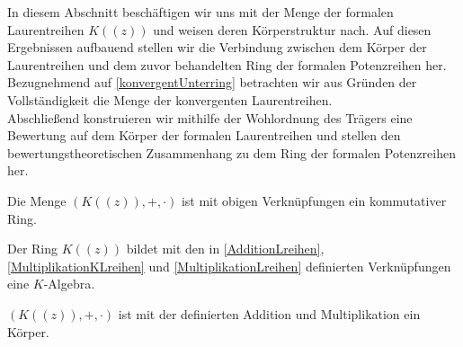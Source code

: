 In diesem Abschnitt beschäftigen wir uns mit der Menge der formalen Laurentreihen $K((z))$ und weisen deren Körperstruktur nach. Auf diesen Ergebnissen aufbauend stellen wir die Verbindung zwischen dem Körper der Laurentreihen und dem zuvor behandelten Ring der formalen Potenzreihen her. Bezugnehmend auf \ref{konvergentUnterring} betrachten wir aus Gründen der Vollständigkeit die Menge der konvergenten Laurentreihen. \\
Abschließend konstruieren wir mithilfe der Wohlordnung des Trägers eine Bewertung auf dem Körper der formalen Laurentreihen und stellen den bewertungstheoretischen Zusammenhang zu dem Ring der formalen Potenzreihen her.
%
%
% 
\begin{satz}
Die Menge $\left(K((z)), +, \cdot\right)$ ist mit obigen Verknüpfungen ein kommutativer Ring.
\end{satz}
%
%
%
%
%
%
%
\begin{bem}
Der Ring $K((z))$ bildet mit den in \ref{AdditionLreihen}, \ref{MultiplikationKLreihen} und \ref{MultiplikationLreihen} definierten Verknüpfungen eine $K$-Algebra.
\end{bem}
%
\begin{satz}\label{Laurentreihenkoerper} %
$\left(K((z)), +, \cdot\right)$ ist mit der definierten Addition und Multiplikation ein Körper. 
\end{satz}
